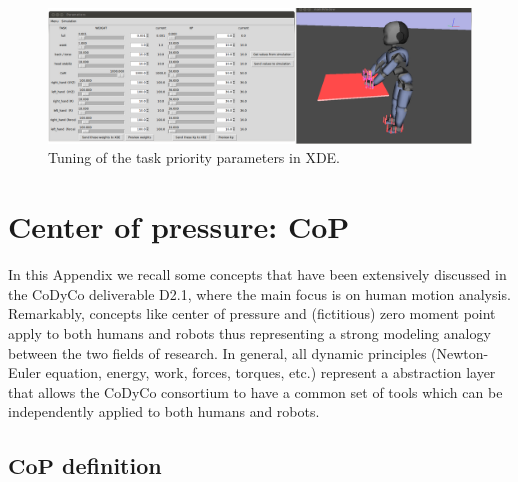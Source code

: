\documentclass[12pt,a4paper,twoside]{article}
\begin{document}
\begin{figure}
\begin{center}
\includegraphics[width=0.9\hsize]{images/s12.png}
\end{center}
\caption{Tuning of the task priority parameters in XDE.}
\label{fig:params}
\end{figure}




\newpage \appendix

\section{Center of pressure: $\bm {CoP}$}

In this Appendix we recall some concepts that have been extensively discussed in the CoDyCo deliverable D2.1, where the main focus is on human motion analysis. Remarkably, concepts like center of pressure and (fictitious) zero moment point apply to both humans and robots thus representing a strong modeling analogy between the two fields of research. In general, all dynamic principles (Newton-Euler equation, energy, work, forces, torques, etc.) represent a abstraction layer that allows the CoDyCo consortium to have a common set of tools which can be independently applied to both humans and robots. 

\subsection{$\bm{CoP}$ definition}
\end{document}
